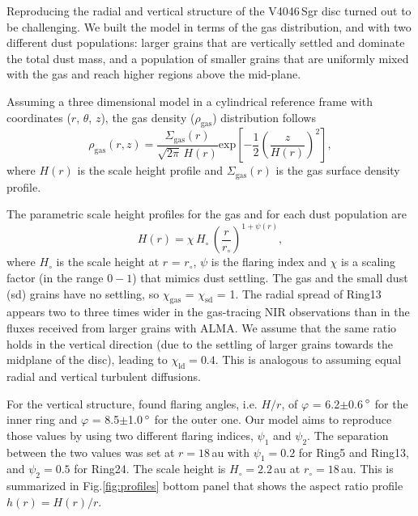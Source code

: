 \documentclass[usenatbib,times]{mnras}
\begin{document}
Reproducing the radial and vertical structure of the V4046\,Sgr disc turned out to be challenging. We built the model in terms of the gas distribution, and with two different dust populations: larger grains that are vertically settled and dominate the total dust mass, and a population of smaller grains that are uniformly mixed with the gas and reach higher regions above the mid-plane. 

Assuming a three dimensional model in a cylindrical reference frame with coordinates ($r$, $\theta$, $z$), the gas density ($\rho_{\mathrm{gas}}$) distribution follows
\begin{equation}
  \rho_{\mathrm{gas}}(r,z) =\frac{\Sigma_{\mathrm{gas}}(r)}{\sqrt{2\pi} \, H(r)} \mathrm{exp}\left[-\frac{1}{2} \left(\frac{z}{H(r)}\right)^2\right],
\end{equation}
where $H(r)$ is the scale height profile and $\Sigma_{\mathrm{gas}}(r)$ is the gas surface density profile. 

The parametric scale height profiles for the gas and for each dust population are 
\begin{equation}
    \label{scale}
  H(r)=\chi \, H_{\circ} \,\left( \frac{r}{r_{\circ}}\right)^{1+\psi(r)},
\end{equation}
where $H_\circ$ is the scale height at $r$ = $r_\circ$, $\psi$ is the flaring index and $\chi$ is a scaling factor (in the range $0-1$) that mimics dust settling. The gas and the small dust (sd) grains have no settling, so $\chi_{\mathrm{gas}}$ = $\chi_{\mathrm{sd}}$ = 1. The radial spread of Ring13 appears two to three times wider in the gas-tracing NIR observations than in the fluxes received from larger grains with ALMA. We assume that the same ratio holds in the vertical direction (due to the settling of larger grains towards the midplane of the disc), leading to $\chi_{\mathrm{ld}}=0.4$. This is analogous to assuming equal radial and vertical turbulent diffusions.

For the vertical structure, \citet{dOrazi} found flaring angles, i.e. $H/r$, of $\varphi$ = 6.2$\pm$0.6\,$\hbox{$^\circ$}$ for the inner ring and $\varphi$ = 8.5$\pm$1.0\,$\hbox{$^\circ$}$ for the outer one. Our model aims to reproduce those values by using two different flaring indices, $\psi_1$ and $\psi_2$. The separation between the two values was set at $r = 18$\,au with $\psi_1=0.2$ for Ring5 and Ring13, and $\psi_2=0.5$ for Ring24. The scale height is $H_\circ = 2.2$\,au at $r_\circ = 18$\,au. This is summarized in Fig.\ref{fig:profiles} bottom panel that shows the aspect ratio profile $h(r)=H(r)/r$. 
\end{document}
